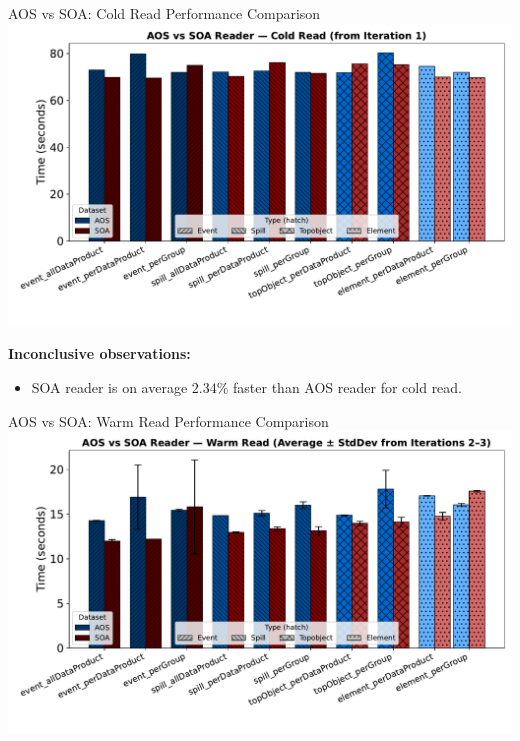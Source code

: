 \documentclass[aspectratio=169]{beamer}
\begin{document}
\begin{frame}{AOS vs SOA: Cold Read Performance Comparison}
  \centering
  \includegraphics[width=0.6\linewidth]{../experiments/Seaborn/AOS_SOA_Reader_Cold_grouped_progressive.pdf}
  
  \textbf{Inconclusive observations:}
  \begin{itemize}
  \item SOA reader is on average $2.34\%$ faster than AOS reader for cold read.
  \end{itemize}
  \end{frame}

\begin{frame}{AOS vs SOA: Warm Read Performance Comparison}
\centering
\includegraphics[width=0.8\linewidth]{../experiments/Seaborn/AOS_SOA_Reader_Warm_grouped_progressive.pdf}
\end{frame}
\end{document}
